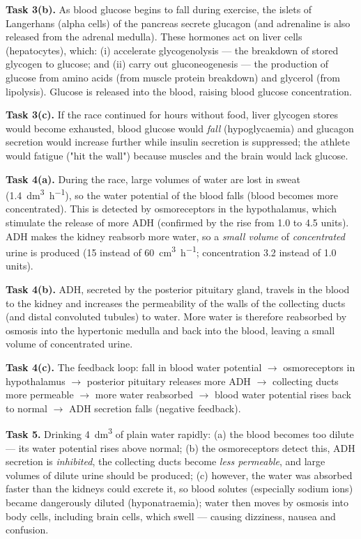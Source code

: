 \documentclass[11pt]{article}
\newcommand{\cle}[1]{{\popxbold\color{popdark}#1}}
\begin{document}
\begin{corrige}
\textbf{Task 3(b).} As blood glucose begins to fall during exercise, the \cle{islets of Langerhans} (alpha cells) of the pancreas secrete \cle{glucagon} (and adrenaline is also released from the adrenal medulla). These hormones act on \cle{liver cells (hepatocytes)}, which: (i) accelerate \cle{glycogenolysis} — the breakdown of stored glycogen to glucose; and (ii) carry out \cle{gluconeogenesis} — the production of glucose from amino acids (from muscle protein breakdown) and glycerol (from lipolysis). Glucose is released into the blood, raising blood glucose concentration.

\textbf{Task 3(c).} If the race continued for hours without food, liver glycogen stores would become exhausted, blood glucose would \emph{fall} (hypoglycaemia) and glucagon secretion would increase further while insulin secretion is suppressed; the athlete would fatigue ("hit the wall") because muscles and the brain would lack glucose.

\textbf{Task 4(a).} During the race, large volumes of water are lost in sweat (\SI{1.4}{dm^{3}.h^{-1}}), so the \cle{water potential of the blood falls} (blood becomes more concentrated). This is detected by \cle{osmoreceptors} in the hypothalamus, which stimulate the release of more \cle{ADH} (confirmed by the rise from 1.0 to 4.5 units). ADH makes the kidney reabsorb more water, so a \emph{small volume} of \emph{concentrated} urine is produced (15 instead of \SI{60}{cm^{3}.h^{-1}}; concentration 3.2 instead of 1.0 units).

\textbf{Task 4(b).} ADH, secreted by the \cle{posterior pituitary gland}, travels in the blood to the kidney and increases the \cle{permeability of the walls of the collecting ducts} (and distal convoluted tubules) to water. More water is therefore reabsorbed by osmosis into the hypertonic medulla and back into the blood, leaving a small volume of concentrated urine.

\textbf{Task 4(c).} The feedback loop: fall in blood water potential $\rightarrow$ osmoreceptors in hypothalamus $\rightarrow$ posterior pituitary releases more ADH $\rightarrow$ collecting ducts more permeable $\rightarrow$ more water reabsorbed $\rightarrow$ blood water potential rises back to normal $\rightarrow$ ADH secretion falls (negative feedback).

\textbf{Task 5.} Drinking \SI{4}{dm^{3}} of plain water rapidly: (a) the blood becomes too dilute — its \cle{water potential rises} above normal; (b) the osmoreceptors detect this, ADH secretion is \emph{inhibited}, the collecting ducts become \emph{less permeable}, and large volumes of dilute urine should be produced; (c) however, the water was absorbed faster than the kidneys could excrete it, so blood solutes (especially sodium ions) became dangerously diluted (\cle{hyponatraemia}); water then moves by osmosis into body cells, including brain cells, which swell — causing dizziness, nausea and confusion.


\end{corrige}
\end{document}
